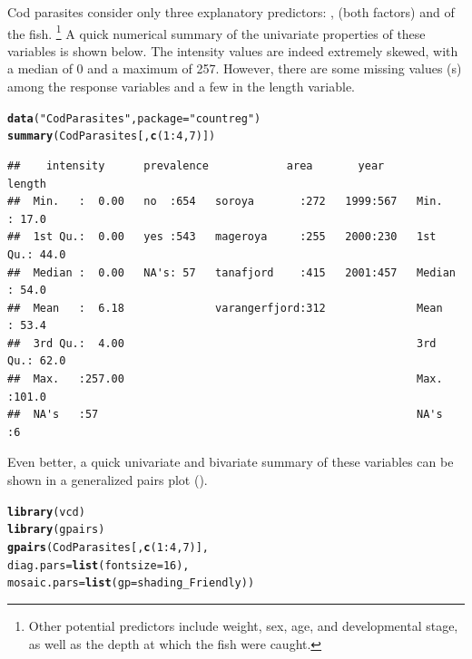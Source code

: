 \documentclass[11pt]{book}\usepackage[]{graphicx}\usepackage[]{color}
\makeatletter
\newcommand{\hlnum}[1]{\textcolor[rgb]{0.686,0.059,0.569}{#1}}%
\newcommand{\hlstr}[1]{\textcolor[rgb]{0.192,0.494,0.8}{#1}}%
\newcommand{\hlopt}[1]{\textcolor[rgb]{0,0,0}{#1}}%
\newcommand{\hlstd}[1]{\textcolor[rgb]{0.345,0.345,0.345}{#1}}%
\newcommand{\hlkwc}[1]{\textcolor[rgb]{0.333,0.667,0.333}{#1}}%
\newcommand{\hlkwd}[1]{\textcolor[rgb]{0.737,0.353,0.396}{\textbf{#1}}}%
\newenvironment{kframe}{%
 \def\at@end@of@kframe{}%
 \ifinner\ifhmode%
  \def\at@end@of@kframe{\end{minipage}}%
  \begin{minipage}{\columnwidth}%
 \fi\fi%
 \def\FrameCommand##1{\hskip\@totalleftmargin \hskip-\fboxsep
 \colorbox{shadecolor}{##1}\hskip-\fboxsep
     \hskip-\linewidth \hskip-\@totalleftmargin \hskip\columnwidth}%
 \MakeFramed {\advance\hsize-\width
   \@totalleftmargin\z@ \linewidth\hsize
   \@setminipage}}%
 {\par\unskip\endMakeFramed%
 \at@end@of@kframe}
\newenvironment{knitrout}{}{} %
\renewenvironment{knitrout}{\small\renewcommand{\baselinestretch}{.85}}{} %
\makeatother
\begin{document}
\begin{Example}[cod1]{Cod parasites}
\citet{Hemmingsen-etal:2005} consider only three explanatory predictors: , 
(both factors) and  of the fish.%
\footnote{
Other potential predictors include weight, sex, age, and developmental stage, as well as the
depth at which the fish were caught.
}
A quick numerical summary of the univariate properties of these variables is shown below.
The intensity values are indeed extremely skewed, with a median of 0 and a maximum of 257.
However, there are some missing values (s) among the response variables and
a few in the length variable.
\begin{knitrout}\footnotesize
{}\color{fgcolor}\begin{kframe}
\begin{alltt}
\hlkwd{data}\hlstd{(}\hlstr{"CodParasites"}\hlstd{,} \hlkwc{package} \hlstd{=} \hlstr{"countreg"}\hlstd{)}
\hlkwd{summary}\hlstd{(CodParasites[,} \hlkwd{c}\hlstd{(}\hlnum{1}\hlopt{:}\hlnum{4}\hlstd{,}\hlnum{7}\hlstd{)])}
\end{alltt}
\begin{verbatim}
##    intensity      prevalence            area       year         length     
##  Min.   :  0.00   no  :654   soroya       :272   1999:567   Min.   : 17.0  
##  1st Qu.:  0.00   yes :543   mageroya     :255   2000:230   1st Qu.: 44.0  
##  Median :  0.00   NA's: 57   tanafjord    :415   2001:457   Median : 54.0  
##  Mean   :  6.18              varangerfjord:312              Mean   : 53.4  
##  3rd Qu.:  4.00                                             3rd Qu.: 62.0  
##  Max.   :257.00                                             Max.   :101.0  
##  NA's   :57                                                 NA's   :6
\end{verbatim}
\end{kframe}
\end{knitrout}

Even better, a quick univariate and bivariate summary of these variables can be shown in a generalized pairs plot
().
\begin{knitrout}
\color{fgcolor}\begin{kframe}
\begin{alltt}
\hlkwd{library}\hlstd{(vcd)}
\hlkwd{library}\hlstd{(gpairs)}
\hlkwd{gpairs}\hlstd{(CodParasites[,} \hlkwd{c}\hlstd{(}\hlnum{1}\hlopt{:}\hlnum{4}\hlstd{,}\hlnum{7}\hlstd{)],}
       \hlkwc{diag.pars}\hlstd{=}\hlkwd{list}\hlstd{(}\hlkwc{fontsize}\hlstd{=}\hlnum{16}\hlstd{),}
       \hlkwc{mosaic.pars}\hlstd{=}\hlkwd{list}\hlstd{(}\hlkwc{gp}\hlstd{=shading_Friendly))}
\end{alltt}
\end{kframe}\begin{figure}[htb!]



\end{figure}
\end{knitrout}
\end{Example}
\end{document}
